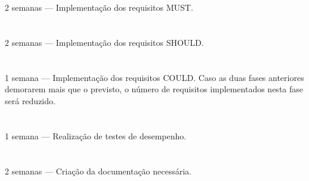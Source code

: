 \documentclass[12pt,a4paper]{article}
\begin{document}
\paragraph{}
    \textbf{}\\
    2 semanas --- Implementação dos requisitos MUST.
\paragraph{}
    \textbf{}\\
    2 semanas --- Implementação dos requisitos SHOULD.
\paragraph{}
    \textbf{}\\
    1 semana --- Implementação dos requisitos COULD. Caso as duas fases anteriores demorarem mais que o previsto, o número de requisitos implementados nesta fase será reduzido.
\paragraph{}
    \textbf{}\\
    1 semana --- Realização de testes de desempenho.
\paragraph{}
    \textbf{}\\
    2 semanas --- Criação da documentação necessária.
\end{document}
